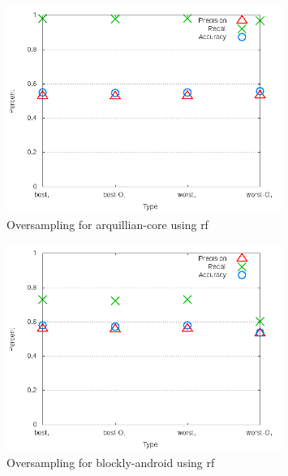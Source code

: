 \begin{figure}
\centering
\includegraphics[width=0.8\textwidth]{images/rf/test_4/arquillian-core_sample_range.png}
\caption{Oversampling for arquillian-core using \gls{rf}}
\label{fig:test_4_arquillian-core_rf}
\end{figure}
\clearpage

\begin{figure}[!t]
\centering
\includegraphics[width=0.8\textwidth]{images/rf/test_4/blockly-android_sample_range.png}
\caption{Oversampling for blockly-android using \gls{rf}}
\label{fig:test_4_blockly-android_rf}
\end{figure}

